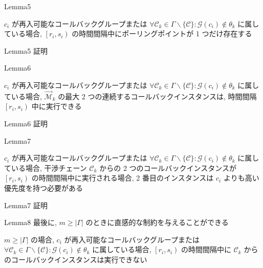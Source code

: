\begin{frame}{Lemma5}
    \begin{lemma}[]
        $c_{i}$ が再入可能なコールバックグループまたは $\forall \mathcal{C}_{k} \in \Gamma \backslash\{\mathcal{C}\}: \mathcal{G}\left(c_{i}\right) \notin \theta_{k}$ に属している場合, $\left[r_{i}, s_{i}\right)$ の時間間隔中にポーリングポイントが 1 つだけ存在する
    \end{lemma}
\end{frame}

\begin{frame}{Lemma5 証明}
    \todo{}
\end{frame}

\begin{frame}{Lemma6}
    \begin{lemma}[]
        $c_{i}$ が再入可能なコールバックグループまたは $\forall \mathcal{C}_{k} \in \Gamma \backslash\{\mathcal{C}\}: \mathcal{G}\left(c_{i}\right) \notin \theta_{k}$ に属している場合, $\overrightarrow{\mathcal{M}}_{k}$ の最大 2 つの連続するコールバックインスタンスは, 時間間隔 $\left[r_{i}, s_{i}\right)$ 中に実行できる
    \end{lemma}
\end{frame}

\begin{frame}{Lemma6 証明}
    \todo{}
\end{frame}

\begin{frame}{Lemma7}
    \begin{lemma}[]
        $c_{i}$ が再入可能なコールバックグループまたは $\forall \mathcal{C}_{k} \in \Gamma \backslash\{\mathcal{C}\}: \mathcal{G}\left(c_{i}\right) \notin \theta_{k}$ に属している場合, 干渉チェーン $\mathcal{C}_{k}$ からの 2 つのコールバックインスタンスが $\left[r_{i}, s_{i}\right)$ の時間間隔中に実行される場合, 2 番目のインスタンスは $c_{i}$ よりも高い優先度を持つ必要がある
    \end{lemma}
\end{frame}

\begin{frame}{Lemma7 証明}
    \todo{}
\end{frame}

\begin{frame}{Lemma8}
    最後に, $m \geq|\Gamma|$ のときに直感的な制約を与えることができる
    \begin{lemma}[]
        $m \geq|\Gamma|$ の場合, $c_{i}$ が再入可能なコールバックグループまたは $\forall \mathcal{C}_{k} \in \Gamma \backslash\{\mathcal{C}\}: \mathcal{G}\left(c_{i}\right) \notin \theta_{k}$ に属している場合, $\left[r_{i}, s_{i}\right)$ の時間間隔中に $\mathcal{C}_{k}$ からのコールバックインスタンスは実行できない
    \end{lemma}
\end{frame}

